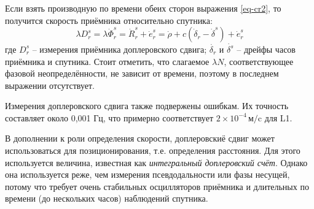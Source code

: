 Если взять производную по времени обеих сторон выражения \eqref{eq-cr2}, то получится скорость приёмника относительно спутника:
\begin{equation}
\lambda D_r^s=\lambda\dot{\Phi}_r^s=\dot{R}_r^s+\dot{e}_r^s=\dot{\rho}+c(\dot{\delta}_r-\dot{\delta}^s)+\dot{e}_r^s     
\end{equation}
где 
$D_r^s$ -- измерения приёмника доплеровского сдвига;
$\dot{\delta_r}$ и $\dot{\delta^s}$ -- дрейфы часов приёмника и спутника.
Стоит отметить, что слагаемое $\lambda N$, соответствующее фазовой неопределённости, не зависит от времени, поэтому в последнем выражении отсутствует.

Измерения доплеровского сдвига также подвержены ошибкам. 
Их точность составляет около 0,001 Гц, что примерно соответствует $2\times10^{-4}\,\text{м/c}$ для L1.

В дополнении к роли определения скорости, доплеровскиё сдвиг может использоваться для позиционирования, т.е. определения расстояния.
Для этого используется величина, известная как \textit{интегральный доплеровский счёт}.
Однако она используется реже, чем измерения псевдодальности или фазы несущей, потому что требует очень стабильных осцилляторов приёмника и длительных по времени (до нескольких часов) наблюдений спутника. 